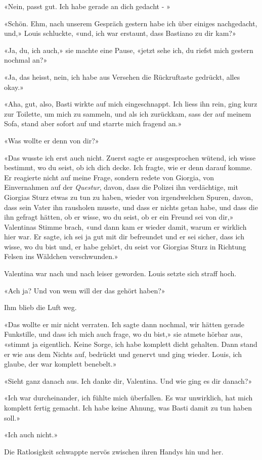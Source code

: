 «Nein, passt gut. Ich habe gerade an dich gedacht - »

«Schön. Ehm, nach unserem Gespräch gestern habe ich über einiges
nachgedacht, und,» Louis schluckte, «und, ich war erstaunt, dass Bastiano
zu dir kam?»

«Ja, du, ich auch,» sie machte eine Pause, «jetzt sehe ich, du riefst
mich gestern nochmal an?»

«Ja, das heisst, nein, ich habe aus Versehen die Rückruftaste gedrückt,
alles okay.»

«Aha, gut, also, Basti wirkte auf mich eingeschnappt. Ich liess ihn
rein, ging kurz zur Toilette, um mich zu sammeln, und als ich zurückkam,
sass der auf meinem Sofa, stand aber sofort auf und starrte mich fragend
an.»

«Was wollte er denn von dir?»

«Das wusste ich erst auch nicht. Zuerst sagte er ausgesprochen wütend,
ich wisse bestimmt, wo du seist, ob ich dich decke. Ich fragte, wie er
denn darauf komme. Er reagierte nicht auf meine Frage, sondern redete
von Giorgia, von Einvernahmen auf der \emph{Questur}, davon, dass die Polizei
ihn verdächtige, mit Giorgias Sturz etwas zu tun zu haben, wieder von
irgendwelchen Spuren, davon, dass sein Vater ihn rausholen musste, und
dass er nichts getan habe, und dass die ihn gefragt hätten, ob er wisse,
wo du seist, ob er ein Freund sei von dir,» Valentinas Stimme brach, «und
dann kam er wieder damit, warum er wirklich hier war. Er sagte, ich sei
ja gut mit dir befreundet und er sei sicher, dass ich wisse, wo du bist
und, er habe gehört, du seist vor Giorgias Sturz in Richtung Felsen ins
Wäldchen verschwunden.»

Valentina war nach und nach leiser geworden. Louis setzte sich
straff hoch.

«Ach ja? Und von wem will der das gehört haben?»

Ihm blieb die Luft weg.

«Das wollte er mir nicht verraten. Ich sagte dann nochmal, wir hätten
gerade Funkstille, und dass ich mich auch frage, wo du bist,» sie atmete
hörbar aus, «stimmt ja eigentlich. Keine Sorge, ich habe komplett dicht
gehalten. Dann stand er wie aus dem Nichts auf, bedrückt und genervt und
ging wieder. Louis, ich glaube, der war komplett benebelt.»

«Sieht ganz danach aus. Ich danke dir, Valentina. Und wie ging es dir
danach?»

«Ich war durcheinander, ich fühlte mich überfallen. Es war unwirklich,
hat mich komplett fertig gemacht. Ich habe keine Ahnung, was Basti damit zu tun haben
soll.»

«Ich auch nicht.»

Die Ratlosigkeit schwappte nervös zwischen ihren Handys hin und her.

